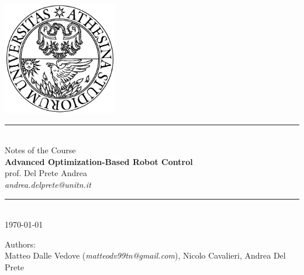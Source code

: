\thispagestyle{empty}
\begin{center}
	$\quad$\vspace{1cm} 
	
	\includegraphics[width=5cm]{Images/logo} \vspace{2cm}
	
	\rule{7cm}{1pt} \vspace{1cm} \\
	{\Large Notes of the Course} \vspace{0.5cm} \\
	{{\LARGE \bfseries Advanced Optimization-Based Robot Control}} \vspace{0.5cm} \\
	{\Large prof. Del Prete Andrea } \vspace{2mm} \\ \textit{andrea.delprete@unitn.it} 
	\vspace{1cm} \\ \rule{7cm}{1pt} \vspace{1cm} \\
	
	{\large \today}
	
	\vspace{3cm}
	
	Authors: \vspace{2mm} \\
	Matteo Dalle Vedove (\textit{matteodv99tn@gmail.com}), Nicolo Cavalieri, Andrea Del Prete
	
\end{center}